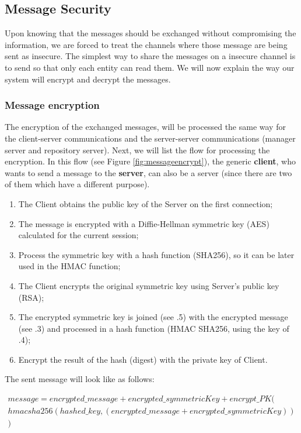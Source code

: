 \subsection{Message  Security}
Upon knowing that the messages should be exchanged without compromising the  information, we are forced to treat the channels where those message are being sent as insecure.
The simplest way to share the messages on a insecure channel is to send so that only each entity can read them.
We will now explain the way our system will encrypt and decrypt the messages.
\subsubsection{Message encryption}\label{sssec:num411}

The encryption of the exchanged messages, will be processed the same way for the client-server communications and the server-server communications (manager server and repository server). Next, we will list the flow for processing the encryption.                   
In this flow (see Figure \ref{fig:messageencrypt}), the generic \textbf{client}, who wants to send a message to the \textbf{server}, can also be a server (since there are two of them which have a different purpose).
 
\begin{enumerate}[font=\bfseries]
    \item The Client obtains the public key of the Server on the first connection;
    \item The message is encrypted with a Diffie-Hellman symmetric key (AES) calculated for the current session;
    \item Process the symmetric key with a hash function (SHA256), so it can be later used in the HMAC function;
    \item The Client encrypts the original symmetric key using Server’s public key (RSA);
    \item The encrypted symmetric key is joined (see .5) with the encrypted message (see .3) and processed in a hash function (HMAC SHA256, using the key of .4);
    \item Encrypt the result of the hash (digest) with the private key of Client.
\end{enumerate}

The sent message will look like as follows:

\begin{equation}\label{eq:1}
\begin{split}
    message=encrypted\_message + encrypted\_symmetricKey +encrypt\_PK(\\
    hmacsha256(hashed\_key,(encrypted\_message +encrypted\_symmetricKey))\\
    )
\end{split}
\end{equation}

